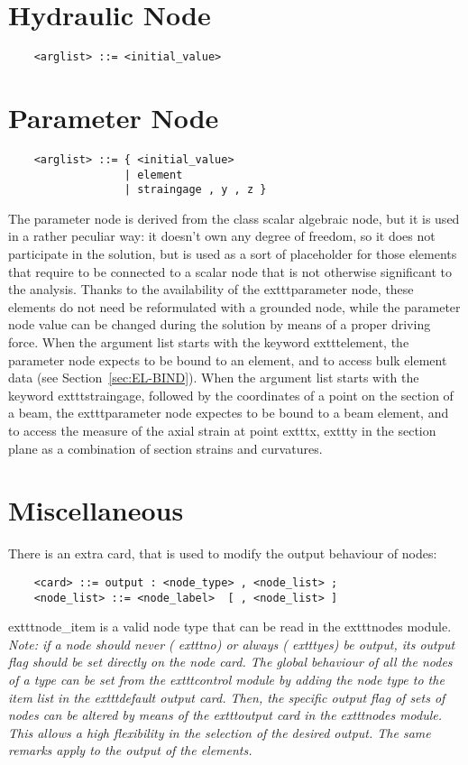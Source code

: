 \section{Hydraulic Node}
\begin{verbatim}
    <arglist> ::= <initial_value>
\end{verbatim}



\section{Parameter Node}
\begin{verbatim}
    <arglist> ::= { <initial_value>
                  | element 
                  | straingage , y , z }
\end{verbatim}
The parameter node is derived from the class scalar algebraic node, but it
is used in a rather peculiar way: it doesn't own any degree of freedom,
so it does not participate in the solution, but is used as a sort of
placeholder for those elements that require to be connected to a scalar node
that is not otherwise significant to the analysis.
Thanks to the availability of the 	exttt{parameter} node, these elements
do not need be reformulated with a grounded node, while the parameter
node value can be changed during the solution by means of a proper driving 
force.
When the argument list starts with the keyword 	exttt{element}, the parameter
node expects to be bound to an element, and to access bulk element data 
(see Section~\ref{sec:EL-BIND}).
When the argument list starts with the keyword 	exttt{straingage}, followed by
the coordinates of a point on the section of a beam, the 	exttt{parameter}
node expectes to be bound to a beam element, and to access the measure of
the axial strain at point 	exttt{x}, 	exttt{y} in the section plane as a
combination of section strains and curvatures.





\section{Miscellaneous}
There is an extra card, that is used to modify the output behaviour of nodes:  
\begin{verbatim}
    <card> ::= output : <node_type> , <node_list> ;
    <node_list> ::= <node_label>  [ , <node_list> ]
\end{verbatim}
	exttt{node\_item} is a valid node type that can be read in the 	exttt{nodes}
module. \\
{\em
   Note: if a node should never (	exttt{no}) or always (	exttt{yes}) be output,
   its output flag should be set directly on the node card. 
   The global behaviour of all the nodes of a type can be set from the 
   	exttt{control} module by adding the node type to the item list in the 
   	exttt{default output} card. 
   Then, the specific output flag of sets of nodes can be altered by means 
   of the 	exttt{output} card in the 	exttt{nodes} module. 
   This allows a high flexibility in the selection of the desired output. 
   The same remarks apply to the output of the elements.
}






